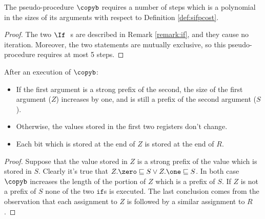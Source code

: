 \begin{lemma}
\label{lemma:compcopyb}
The pseudo-procedure $\copyb$ requires a number of steps which is a
polynomial in the sizes of its arguments with respect to Definition \ref{def:sifpcost}.
\end{lemma}

\begin{proof}
The two $\If \ \ $s are described in Remark \ref{remark:if},
 and they cause no iteration. Moreover,
 the two statements are mutually exclusive,
 so this pseudo-procedure requires at most 5 steps.
\end{proof}

\begin{lemma}
\label{lemma:corrcopyb}
After an execution of $\copyb$:
\begin{itemize}
\item If the first argument is a strong prefix of the second,
the size of the first argument ($Z$) increases by one,
and is still a prefix of the second argument ($S$).
\item Otherwise, the values stored in the first two registers don't change.
\item Each bit which is stored at the end of $Z$ is stored at the end of $R$.
\end{itemize}
\end{lemma}

\begin{proof}
Suppose that the value stored in $Z$ is a strong prefix of the value which is stored in $S$. Clearly it's true that $Z.\zero \sqsubseteq S \lor Z.\one\sqsubseteq S$. In both case $\copyb$ increases the length of the portion of $Z$ which is a prefix of $S$. If $Z$ is not a prefix of $S$ none of the two $\mathtt{if}$s is executed. The last conclusion comes from the observation that each assignment to $Z$ is followed by a similar assignment to $R$.
\end{proof}

